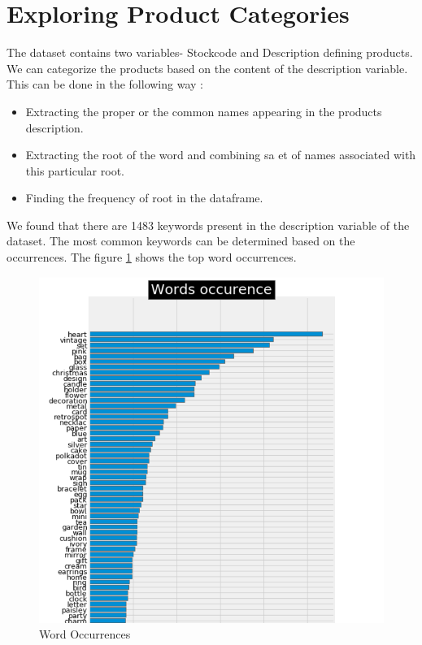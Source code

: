 \section{Exploring Product Categories}

The dataset contains two variables- Stockcode and Description defining products. We can categorize the products based on the content of the description variable. This can be done in the following way :\\

\begin{itemize}
  \item Extracting the proper or the common names appearing in the products description.
  \item Extracting the root of the word and combining sa et of names associated with this particular root.
  \item Finding the frequency of root in the dataframe.
 \end{itemize}
 
 We found that there are 1483 keywords present in the description variable of the dataset. The most common keywords can be determined based on the occurrences. The figure \ref{3.1} shows the top word occurrences.
 
 \begin{figure}[H]
\caption{Word Occurrences}
\label{3.1}
\centering
\includegraphics[width=\columnwidth]{images/3_1.PNG}
\end{figure}

